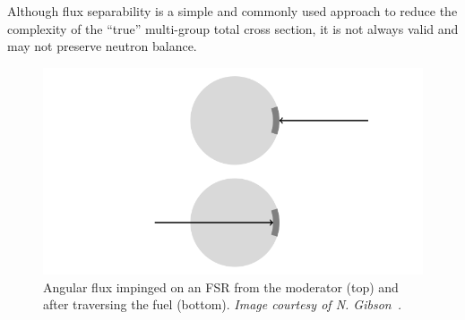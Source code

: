 Although flux separability is a simple and commonly used approach to reduce the complexity of the ``true'' multi-group total cross section, it is not always valid and may not preserve neutron balance.

\begin{figure}[h]
  \centering
  \includegraphics[width=\linewidth]{figures/incoming-outgoing}
  \caption{Angular flux impinged on an FSR from the moderator (top) and after traversing the fuel (bottom). \textit{Image courtesy of N. Gibson~\cite{gibson2016thesis}.}}
\label{fig:incoming-outgoing}
\end{figure}


